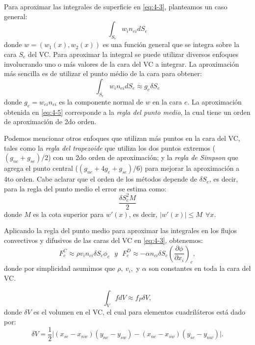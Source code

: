 \documentclass[a4paper,10pt, oneside]{book}
\begin{document}
Para aproximar las integrales de superficie en \ref{eq:4-3}, planteamos un caso general:
\begin{equation}
	\int_{S_e} w_i n_{ei} dS_e \nonumber
\end{equation} 
donde $w = (w_1(x) , w_2(x))$ es una función general que se integra sobre la cara $S_e$ del VC. Para aproximar la integral se puede utilizar diversos enfoques involucrando uno o más valores de la cara del VC a integrar. La aproximación más sencilla es de utilizar el punto médio de la cara para obtener:
\begin{equation}
	\int_{S_e} w_i n_{ei} dS_e \approx g_e \delta S_e
	\label{eq:4-5}
\end{equation}
donde $g_e = w_{ei} n_{ei}$ es la componente normal de $w$ en la cara $e$. La aproximación obtenida en \ref{eq:4-5} corresponde a la \textit{regla del punto medio}, la cual tiene un orden de aproximación de 2do orden.

Podemos mencionar otros enfoques que utilizan más puntos en la cara del VC, tales como la \textit{regla del trapezoide} que utiliza los dos puntos extremos ($(g_{ne} + g_{se})/2$) con un 2do orden de aproximación; y la \textit{regla de Simpson} que agrega el punto central ($(g_{ne} + 4g_{e} + g_{se})/6$) para mejorar la aproximación a 4to orden. Cabe aclarar que el orden de los métodos depende de $\delta S_e$, es decir, para la regla del punto medio el error se estima como:
\begin{equation}
	\frac{\delta S_e^2 M}{2}  \nonumber
\end{equation}
donde $M$ es la cota superior para $w'(x)$, es decir, $\vert w'(x) \vert \leq M ~~ \forall x$.

Aplicando la regla del punto medio para aproximar las integrales en los flujos convectivos y difusivos de las caras del VC en \ref{eq:4-3}, obtenemos:
\begin{equation}
	F_c^C \approx \rho v_i n_{ci} \delta S_c \phi_c ~~~ y ~~~ F_c^D \approx - \alpha n_{ci} \delta S_c \left( \frac{\partial \phi}{\partial x_i} \right)_c , \nonumber
\end{equation}
donde por simplicidad asumimos que $\rho, ~ v_i,$ y $\alpha$ son constantes en toda la cara del VC.

\begin{equation}
	\int_V f dV \approx f_P \delta V, \nonumber
\end{equation} 
donde $\delta V$ es el volumen en el VC, el cual para elementos cuadriláteros está dado por:
\begin{equation}
	\delta V = \frac12 \vert(x_{se} - x_{nw})(y_{ne} - y_{sw})-(x_{ne} - x_{sw})(y_{se} - y_{nw})\vert \nonumber .
\end{equation}
\end{document}
